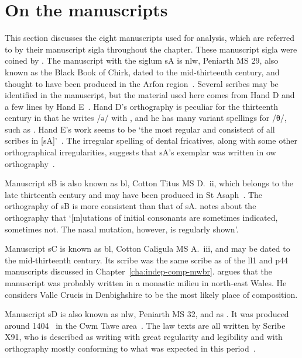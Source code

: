 \section{On the manuscripts}
\label{sec:manuscripts}
This section discusses the eight manuscripts used for analysis, which are referred to by their manuscript sigla throughout the chapter. These manuscript sigla were coined by \textcite{owen_ancient_1841}.
The manuscript with the siglum \gls{sA} is  \acrshort{nlw}, Peniarth MS 29, also known as the Black Book of Chirk, dated to the mid-thirteenth century, and thought to have been produced in the Arfon region~\autocite[171]{Rus_Scribal95}.
Several scribes may be identified in the manuscript, but the material used here comes from Hand D and a few lines by Hand E~\autocite[133--134]{Rus_Scribal95}.
Hand D's orthography is peculiar for the thirteenth century in that he writes /ə/ with , and he has many variant spellings for /θ/, such as .
Hand E's work seems to be `the most regular and consistent of all scribes in [\gls{sA}]'~\autocite[152]{Rus_Scribal95}.
The irregular spelling of dental fricatives, along with some other orthographical irregularities, suggests that \gls{sA}'s exemplar was written in \gls{ow} orthography~\autocite[169]{Rus_Scribal95}. 

Manuscript \gls{sB} is also known as \acrshort{bl}, Cotton Titus MS D.~ii, which belongs to the late thirteenth century and may have been produced in St Asaph~\autocite[v]{elias_golygiad_2007}. The orthography of \gls{sB} is more consistent than that of \gls{sA}. \Textcite[xlii]{wiliam_llyfr_1960} notes about the orthography that `[m]utations of initial consonants are sometimes indicated, sometimes not. The nasal mutation, however, is regularly shown'.

Manuscript \gls{sC} is known  as \acrshort{bl}, Cotton Caligula MS A.~iii, and may be dated to the mid-thirteenth century. Its scribe was the same scribe as of the \gls{ll1} and \gls{p44} manuscripts discussed in Chapter~\ref{cha:indep-comp-mwbr}. \Textcite[189]{huws_medieval_2000} argues that the manuscript was probably written in a monastic milieu in north-east Wales. He considers Valle Crucis in Denbighshire to be the most likely place of composition.

Manuscript \gls{sD} is also known as \acrshort{nlw}, Peniarth MS 32, and as . It was produced around 1404~\autocite[60]{huws_medieval_2000} in the Cwm Tawe area~\autocite[v]{elias_golygiad_2007}. The law texts are all written by Scribe X91, who is described as writing with great regularity and legibility and with orthography mostly conforming to what was expected in this period~\autocite{thomas_tei_2013}.

